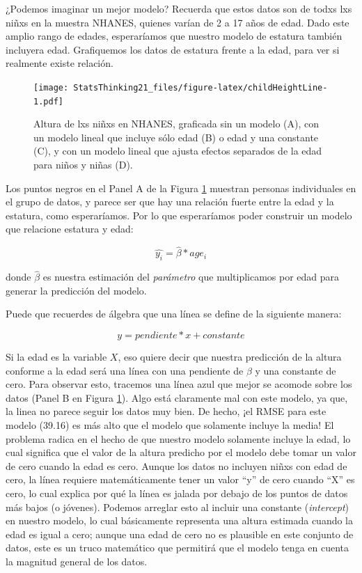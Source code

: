 \documentclass[
  12pt,
]{book}
\begin{document}
¿Podemos imaginar un mejor modelo? Recuerda que estos datos son de todxs lxs niñxs en la muestra NHANES, quienes varían de 2 a 17 años de edad. Dado este amplio rango de edades, esperaríamos que nuestro modelo de estatura también incluyera edad. Grafiquemos los datos de estatura frente a la edad, para ver si realmente existe relación.

\begin{figure}
\centering
\texttt{[image: StatsThinking21\_files/figure-latex/childHeightLine-1.pdf]}
\caption{\label{fig:childHeightLine}Altura de lxs niñxs en NHANES, graficada sin un modelo (A), con un modelo lineal que incluye sólo edad (B) o edad y una constante (C), y con un modelo lineal que ajusta efectos separados de la edad para niños y niñas (D).}
\end{figure}

Los puntos negros en el Panel A de la Figura \ref{fig:childHeightLine} muestran personas individuales en el grupo de datos, y parece ser que hay una relación fuerte entre la edad y la estatura, como esperaríamos. Por lo que esperaríamos poder construir un modelo que relacione estatura y edad:

\[
\hat{y_i} =  \hat{\beta} * age_i
\]

donde \(\hat{\beta}\) es nuestra estimación del \emph{parámetro} que multiplicamos por edad para generar la predicción del modelo.

Puede que recuerdes de álgebra que una línea se define de la siguiente manera:

\[
y = pendiente*x + constante
\]

Si la edad es la variable \(X\), eso quiere decir que nuestra predicción de la altura conforme a la edad será una línea con una pendiente de \(\beta\) y una constante de cero. Para observar esto, tracemos una línea azul que mejor se acomode sobre los datos (Panel B en Figura \ref{fig:childHeightLine}). Algo está claramente mal con este modelo, ya que, la linea no parece seguir los datos muy bien. De hecho, ¡el RMSE para este modelo (39.16) es más alto que el modelo que solamente incluye la media! El problema radica en el hecho de que nuestro modelo solamente incluye la edad, lo cual significa que el valor de la altura predicho por el modelo debe tomar un valor de cero cuando la edad es cero. Aunque los datos no incluyen niñxs con edad de cero, la línea requiere matemáticamente tener un valor ``y'' de cero cuando ``X'' es cero, lo cual explica por qué la línea es jalada por debajo de los puntos de datos más bajos (o jóvenes). Podemos arreglar esto al incluir una constante (\emph{intercept}) en nuestro modelo, lo cual básicamente representa una altura estimada cuando la edad es igual a cero; aunque una edad de cero no es plausible en este conjunto de datos, este es un truco matemático que permitirá que el modelo tenga en cuenta la magnitud general de los datos.
\end{document}
